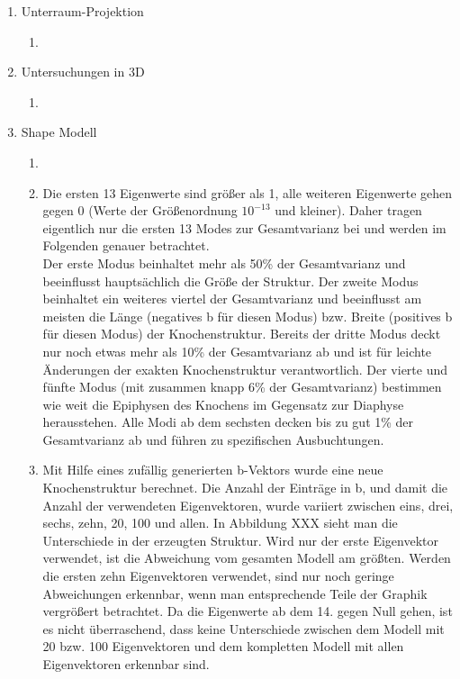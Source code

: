 \documentclass[]{report}
\begin{document}
\begin{enumerate}
\begin{enumerate}
	\end{enumerate}
	\item Unterraum-Projektion
	\begin{enumerate}
		\item
	\end{enumerate}
	
	\item Untersuchungen in 3D
	\begin{enumerate}
		\item
	\end{enumerate}
	
	\item Shape Modell
	\begin{enumerate}
		\item
		\item %
		Die ersten 13 Eigenwerte sind größer als 1, alle weiteren Eigenwerte gehen gegen 0 (Werte der Größenordnung $10^{-13}$ und kleiner). Daher tragen eigentlich nur die ersten 13 Modes zur Gesamtvarianz bei und werden im Folgenden genauer betrachtet.\\
		Der erste Modus beinhaltet mehr als 50\% der Gesamtvarianz und beeinflusst hauptsächlich die Größe der Struktur.
		Der zweite Modus beinhaltet ein weiteres viertel der Gesamtvarianz und beeinflusst am meisten die Länge (negatives b für diesen Modus) bzw. Breite (positives b für diesen Modus) der Knochenstruktur.
		Bereits der dritte Modus deckt nur noch etwas mehr als 10\% der Gesamtvarianz ab und ist für leichte Änderungen der exakten Knochenstruktur verantwortlich.
		Der vierte und fünfte Modus (mit zusammen knapp 6\% der Gesamtvarianz) bestimmen wie weit die Epiphysen des Knochens im Gegensatz zur Diaphyse herausstehen.
		Alle Modi ab dem sechsten decken bis zu gut 1\% der Gesamtvarianz ab und führen zu spezifischen Ausbuchtungen.
		\item
		Mit Hilfe eines zufällig generierten b-Vektors wurde eine neue Knochenstruktur berechnet. Die Anzahl der Einträge in b, und damit die Anzahl der verwendeten Eigenvektoren, wurde variiert zwischen eins, drei, sechs, zehn, 20, 100 und allen. In Abbildung XXX %
		sieht man die Unterschiede in der erzeugten Struktur. Wird nur der erste Eigenvektor verwendet, ist die Abweichung vom gesamten Modell am größten. Werden die ersten zehn Eigenvektoren verwendet, sind nur noch geringe Abweichungen erkennbar, wenn man entsprechende Teile der Graphik vergrößert betrachtet. Da die Eigenwerte ab dem 14. gegen Null gehen, ist es nicht überraschend, dass keine Unterschiede zwischen dem Modell mit 20 bzw. 100 Eigenvektoren und dem kompletten Modell mit allen Eigenvektoren erkennbar sind.\\

\end{enumerate}
\end{enumerate}
\end{document}
